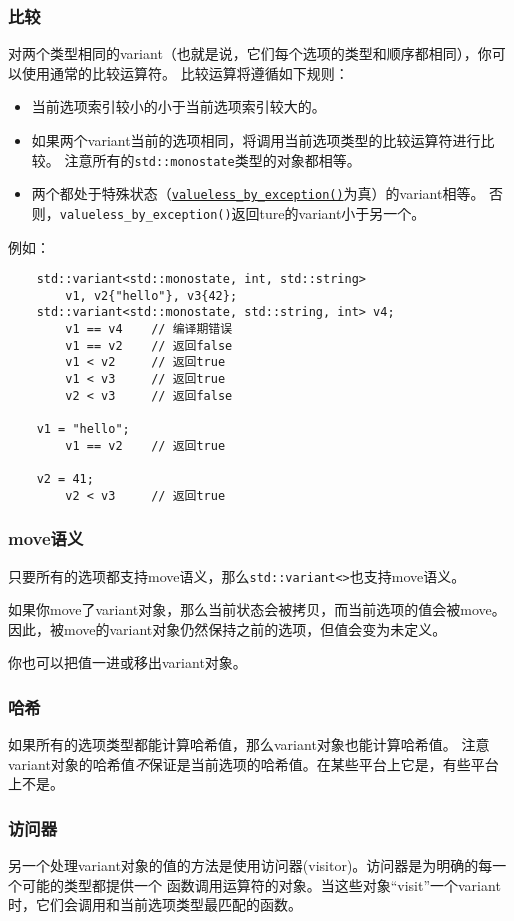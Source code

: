 \subsubsection*{比较}
对两个类型相同的variant（也就是说，它们每个选项的类型和顺序都相同），你可以使用通常的比较运算符。
比较运算将遵循如下规则：
\begin{itemize}[leftmargin=*]
    \item 当前选项索引较小的小于当前选项索引较大的。
    \item 如果两个variant当前的选项相同，将调用当前选项类型的比较运算符进行比较。
    注意所有的\texttt{std::monostate}类型的对象都相等。
    \item 两个都处于特殊状态（\hyperref[ch16.3.4]{\texttt{valueless\_by\_exception()}}为真）的variant相等。
    否则，\texttt{valueless\_by\_exception()}返回ture的variant小于另一个。
\end{itemize}
例如：
\begin{lstlisting}
    std::variant<std::monostate, int, std::string>
        v1, v2{"hello"}, v3{42};
    std::variant<std::monostate, std::string, int> v4;
        v1 == v4    // 编译期错误
        v1 == v2    // 返回false
        v1 < v2     // 返回true
        v1 < v3     // 返回true
        v2 < v3     // 返回false

    v1 = "hello";
        v1 == v2    // 返回true

    v2 = 41;
        v2 < v3     // 返回true
\end{lstlisting}

\subsubsection*{move语义}
只要所有的选项都支持move语义，那么\texttt{std::variant<>}也支持move语义。

如果你move了variant对象，那么当前状态会被拷贝，而当前选项的值会被move。
因此，被move的variant对象仍然保持之前的选项，但值会变为未定义。

你也可以把值一进或移出variant对象。

\subsubsection*{哈希}
如果所有的选项类型都能计算哈希值，那么variant对象也能计算哈希值。
注意variant对象的哈希值\emph{不}保证是当前选项的哈希值。在某些平台上它是，有些平台上不是。

\subsubsection{访问器}\label{ch16.3.3}
另一个处理variant对象的值的方法是使用访问器(visitor)。访问器是为明确的每一个可能的类型都提供一个
函数调用运算符的对象。当这些对象“visit”一个variant时，它们会调用和当前选项类型最匹配的函数。

